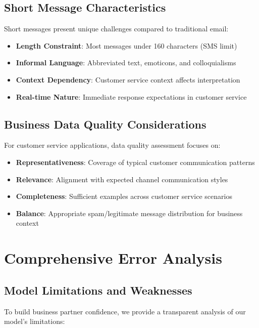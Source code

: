 \documentclass[12pt,a4paper]{article}
\begin{document}
\subsection{Short Message Characteristics}

Short messages present unique challenges compared to traditional email:

\begin{itemize}
    \item \textbf{Length Constraint}: Most messages under 160 characters (SMS limit)
    \item \textbf{Informal Language}: Abbreviated text, emoticons, and colloquialisms
    \item \textbf{Context Dependency}: Customer service context affects interpretation
    \item \textbf{Real-time Nature}: Immediate response expectations in customer service
\end{itemize}

\subsection{Business Data Quality Considerations}

For customer service applications, data quality assessment focuses on:

\begin{itemize}
    \item \textbf{Representativeness}: Coverage of typical customer communication patterns
    \item \textbf{Relevance}: Alignment with expected channel communication styles
    \item \textbf{Completeness}: Sufficient examples across customer service scenarios
    \item \textbf{Balance}: Appropriate spam/legitimate message distribution for business context
\end{itemize}

\section{Comprehensive Error Analysis}

\subsection{Model Limitations and Weaknesses}

To build business partner confidence, we provide a transparent analysis of our model's limitations:
\end{document}
